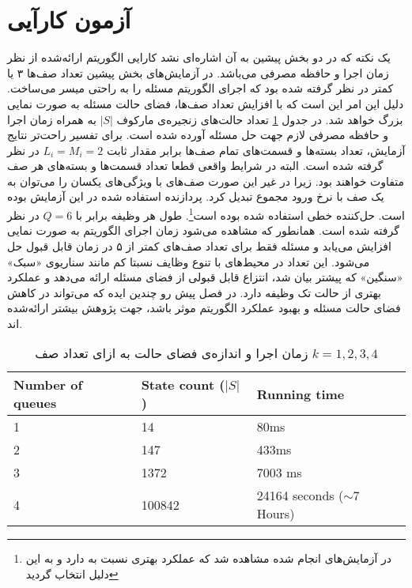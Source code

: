 \section{آزمون کارآیی}
یک نکته که در دو بخش پیشین به آن اشاره‌ای نشد کارایی الگوریتم ارائه‌شده از نظر زمان اجرا و حافظه مصرفی می‌باشد. در آزمایش‌های بخش پیشین تعداد صف‌ها ۳ یا کمتر در نظر گرفته شده بود که اجرای الگوریتم مسئله را به راحتی میسر می‌ساخت. دلیل این امر این است که با افزایش تعداد صف‌ها، فضای حالت مسئله به صورت نمایی بزرگ خواهد شد. در جدول \ref{table:statespace} تعداد حالت‌های زنجیره‌ی مارکوف $|S|$ به همراه زمان اجرا و حافظه مصرفی لازم جهت حل مسئله آورده شده است. برای تفسیر راحت‌تر نتایج آزمایش، تعداد بسته‌ها و قسمت‌های تمام صف‌ها برابر مقدار ثابت $L_i = M_i = 2$ در نظر گرفته شده است. البته در شرایط واقعی قطعا تعداد قسمت‌ها و بسته‌‌های هر صف متفاوت خواهند بود. زیرا در غیر این صورت صف‌های با ویژگی‌های یکسان را می‌توان به یک صف با نرخ ورود مجموع تبدیل کرد. پردازنده استفاده شده در این آزمایش  بوده است. حل‌کننده خطی استفاده شده  بوده است\footnote{در آزمایش‌های انجام شده مشاهده شد که  عملکرد بهتری نسبت به  دارد و به این دلیل انتخاب گردید}. طول هر وظیفه برابر با $Q = 6$ در نظر گرفته شده است. همانطور که مشاهده می‌شود زمان اجرای الگوریتم به صورت نمایی افزایش می‌یابد و مسئله فقط برای تعداد صف‌های کمتر از ۵ در زمان قابل قبول حل می‌شود. این تعداد در محیط‌های با تنوع وظایف نسبتا کم مانند سناریوی «سبک»‌ «سنگین» که پیشتر بیان شد، انتزاع قابل قبولی از فضای مسئله ارائه می‌دهد و عملکرد بهتری از حالت تک وظیفه دارد. در فصل پیش رو چندین ایده که می‌تواند در کاهش فضای حالت مسئله و بهبود عملکرد الگوریتم موثر باشد، جهت پژوهش بیشتر ارائه‌شده اند.
\begin{table}[H]
	\centering
	\begin{latin}
\begin{tabular}{@{}lll@{}}
	\toprule
	Number of queues & State count ($|S|$) & Running time                  \\ \midrule
	1                & 14                & 80ms                          \\
	2                & 147               & 433ms                         \\
	3                & 1372              & 7003 ms                       \\
	4                & 100842            & 24164 seconds ($\sim$7 Hours) \\ \bottomrule
\end{tabular}
	\end{latin}
	\caption{زمان اجرا و اندازه‌ی فضای حالت به ازای تعداد صف $k = 1, 2, 3, 4$}
	\label{table:statespace}
\end{table}
\clearpage
